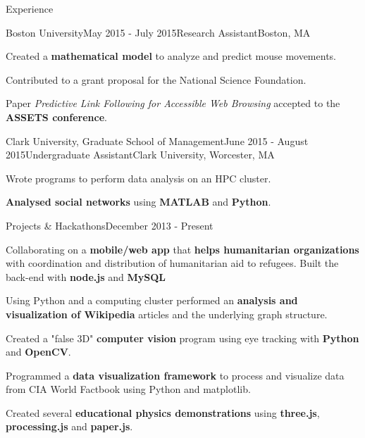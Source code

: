 \documentclass{resume} %
\begin{document}
\begin{rSection}{Experience}

\begin{rSubsection}{Boston University}{May 2015 - July 2015}{Research Assistant}{Boston, MA}
\item Created a \textcolor{mygray}{\textbf{mathematical model}} to analyze and predict mouse movements.
\item Contributed to a grant proposal for the National Science Foundation.
\item Paper \emph{Predictive Link Following for Accessible Web Browsing} accepted to the \textcolor{mygray}{\textbf{ASSETS conference}}.
\end{rSubsection}


\begin{rSubsection}{Clark University, Graduate School of Management}{June 2015 - August 2015}{Undergraduate Assistant}{Clark University, Worcester, MA}
\item Wrote programs to perform data analysis on an HPC cluster.
\item \textcolor{mygray}{\textbf{Analysed social networks}} using \textcolor{mygray}{\textbf{MATLAB}} and \textcolor{mygray}{\textbf{Python}}.
\end{rSubsection}


\begin{rSubsection}{Projects \& Hackathons}{December 2013 - Present}{}{}
\item Collaborating on a \textcolor{mygray}{\textbf{mobile/web app}} that \textcolor{mygray}{\textbf{helps humanitarian organizations}} with coordination and distribution of humanitarian aid to refugees. Built the back-end with \textcolor{mygray}{\textbf{node.js}} and \textcolor{mygray}{\textbf{MySQL}}
\item Using Python and a computing cluster performed an \textcolor{mygray}{\textbf{analysis and visualization of Wikipedia}} articles and the underlying graph structure.
\item Created a "false 3D" \textcolor{mygray}{\textbf{computer vision}} program using eye tracking with \textcolor{mygray}{\textbf{Python}} and \textcolor{mygray}{\textbf{OpenCV}}.
\item Programmed a \textcolor{mygray}{\textbf{data visualization framework}} to process and visualize data from CIA World Factbook using Python and matplotlib.
\item Created several \textcolor{mygray}{\textbf{educational physics demonstrations}} using \textcolor{mygray}{\textbf{three.js}}, \textcolor{mygray}{\textbf{processing.js}} and \textcolor{mygray}{\textbf{paper.js}}.
\end{rSubsection}


\end{rSection}
\end{document}
